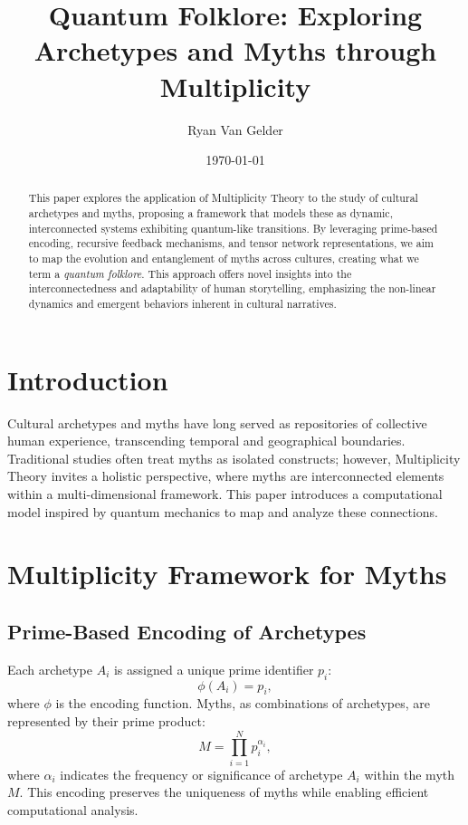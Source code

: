 \documentclass{article}
\theoremstyle{plain}
\begin{document}
\title{Quantum Folklore: Exploring Archetypes and Myths through Multiplicity}

\author{Ryan Van Gelder}
\date{\today}
\maketitle

\begin{abstract}
This paper explores the application of Multiplicity Theory to the study of cultural archetypes and myths, proposing a framework that models these as dynamic, interconnected systems exhibiting quantum-like transitions. By leveraging prime-based encoding, recursive feedback mechanisms, and tensor network representations, we aim to map the evolution and entanglement of myths across cultures, creating what we term a \textit{quantum folklore}. This approach offers novel insights into the interconnectedness and adaptability of human storytelling, emphasizing the non-linear dynamics and emergent behaviors inherent in cultural narratives.
\end{abstract}

\section{Introduction}
Cultural archetypes and myths have long served as repositories of collective human experience, transcending temporal and geographical boundaries. Traditional studies often treat myths as isolated constructs; however, Multiplicity Theory  invites a holistic perspective, where myths are interconnected elements within a multi-dimensional framework. This paper introduces a computational model inspired by quantum mechanics to map and analyze these connections.

\section{Multiplicity Framework for Myths}

\subsection{Prime-Based Encoding of Archetypes}
Each archetype $A_i$ is assigned a unique prime identifier $p_i$:\newline
\begin{equation}
\phi(A_i) = p_i,
\end{equation}
where $\phi$ is the encoding function. Myths, as combinations of archetypes, are represented by their prime product:
\begin{equation}
M = \prod_{i=1}^N p_i^{\alpha_i},
\end{equation}
where $\alpha_i$ indicates the frequency or significance of archetype $A_i$ within the myth $M$. This encoding preserves the uniqueness of myths while enabling efficient computational analysis.
\end{document}
